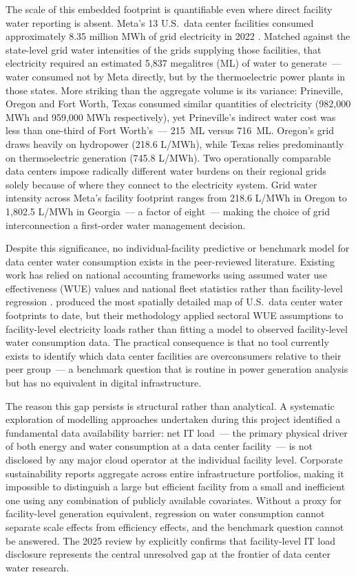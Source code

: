 \documentclass[11pt, letterpaper]{article}
\begin{document}
The scale of this embedded footprint is quantifiable even where direct facility water reporting is absent. Meta's 13 U.S.\ data center facilities consumed approximately 8.35 million MWh of grid electricity in 2022 \citep{meta2023}. Matched against the state-level grid water intensities of the grids supplying those facilities, that electricity required an estimated 5{,}837 megalitres (ML) of water to generate~--- water consumed not by Meta directly, but by the thermoelectric power plants in those states. More striking than the aggregate volume is its variance: Prineville, Oregon and Fort Worth, Texas consumed similar quantities of electricity (982{,}000 MWh and 959{,}000 MWh respectively), yet Prineville's indirect water cost was less than one-third of Fort Worth's~--- 215~ML versus 716~ML. Oregon's grid draws heavily on hydropower (218.6 L/MWh), while Texas relies predominantly on thermoelectric generation (745.8 L/MWh). Two operationally comparable data centers impose radically different water burdens on their regional grids solely because of where they connect to the electricity system. Grid water intensity across Meta's facility footprint ranges from 218.6 L/MWh in Oregon to 1{,}802.5 L/MWh in Georgia~--- a factor of eight~--- making the choice of grid interconnection a first-order water management decision.

Despite this significance, no individual-facility predictive or benchmark model for data center water consumption exists in the peer-reviewed literature. Existing work has relied on national accounting frameworks using assumed water use effectiveness (WUE) values and national fleet statistics rather than facility-level regression \citep{lei2022}. \citep{siddik2021} produced the most spatially detailed map of U.S.\ data center water footprints to date, but their methodology applied sectoral WUE assumptions to facility-level electricity loads rather than fitting a model to observed facility-level water consumption data. The practical consequence is that no tool currently exists to identify which data center facilities are overconsumers relative to their peer group~--- a benchmark question that is routine in power generation analysis but has no equivalent in digital infrastructure.

The reason this gap persists is structural rather than analytical. A systematic exploration of modelling approaches undertaken during this project identified a fundamental data availability barrier: net IT load~--- the primary physical driver of both energy and water consumption at a data center facility~--- is not disclosed by any major cloud operator at the individual facility level. Corporate sustainability reports aggregate across entire infrastructure portfolios, making it impossible to distinguish a large but efficient facility from a small and inefficient one using any combination of publicly available covariates. Without a proxy for facility-level generation equivalent, regression on water consumption cannot separate scale effects from efficiency effects, and the benchmark question cannot be answered. The 2025 review by \citep{lei2025} explicitly confirms that facility-level IT load disclosure represents the central unresolved gap at the frontier of data center water research.
\end{document}
